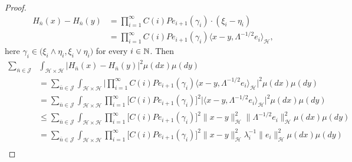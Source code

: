 \documentclass[review, onefignum, onetabnum]{siamart171218}
\begin{document}
\begin{proof}
\begin{equation}
\label{s3.6}
\begin{aligned}
    H_{\bar n}(x)-H_{\bar n}(y)&=\prod_{i=1}^\infty C(i)Pe_{i+1}(\gamma_i)
    \cdot
    (\xi_i-\eta_i)
    \\
    &=
    \prod_{i=1}^\infty
    C(i)Pe_{i+1}(\gamma_i)
    \langle
        x-y, \Lambda^{-1/2}e_i
    \rangle_{\mathcal{H}},
 \end{aligned}
\end{equation}
here $\gamma_i\in \big(\xi_i\wedge\eta_i, \xi_i\vee \eta_i  \big)$
for every $i\in {\mathbb N}$.
Then
\begin{equation}
    \label{s3.8}
    \begin{aligned}
        \sum_{\bar n\in \mathcal{J}}
        &
        \int_{\mathcal{H}\times \mathcal{H}}
            \big|
                H_{\bar n}(x) -H_{\bar n}(y)
            \big|^2
        \mu(dx)\mu(dy)
        \\
        &=
        \sum_{\bar n\in \mathcal{J}}
            \int_{\mathcal{H}\times \mathcal{H}}
                \Big|
                    \prod_{i=1}^\infty C(i)Pe_{i+1}(\gamma_i)
                    \langle
                        x-y,
                        \Lambda^{-1/2}e_i
                    \rangle_{\mathcal{H}}
                \Big|^2
        \mu(dx)\mu(dy)
        \\
        &=
        \sum_{\bar n\in \mathcal{J}}
        \int_{\mathcal{H}\times \mathcal{H}}
            \prod_{i=1}^\infty
            \Big[
                C(i) Pe_{i+1}(\gamma_i)\Big]^2
            \Big|
                \langle
                    x-y,\Lambda^{-1/2}e_i
                \rangle_{\mathcal{H}}
            \Big|^2
            \mu(dx) \mu(dy)
        \\
        &\le
            \sum_{\bar n\in \mathcal{J}}
            \int_{\mathcal{H} \times \mathcal{H}}
                \prod_{i=1}^\infty
                \Big[
                    C(i)Pe_{i+1}(\gamma_i)
                \Big]^2
                \| x-y\|_{\mathcal{H}}^2
                \|\Lambda^{-1/2} e_i\|_{\mathcal{H}}^2
            \mu(dx)\mu(dy)
        \\
        &=
            \sum_{\bar n\in \mathcal{J}}
            \int_{\mathcal{H}\times \mathcal{H}}
                \prod_{i=1}^\infty
                \Big[
                    C(i)Pe_{i+1}(\gamma_i)
                \Big]^2
                \| x-y\|_{\mathcal{H}}^2
                \lambda_i^{-1}
                \|e_i\|_{\mathcal{H}}^2
            \mu(dx)\mu(dy)
        \\

\end{aligned}
\end{equation}
\end{proof}
\end{document}
